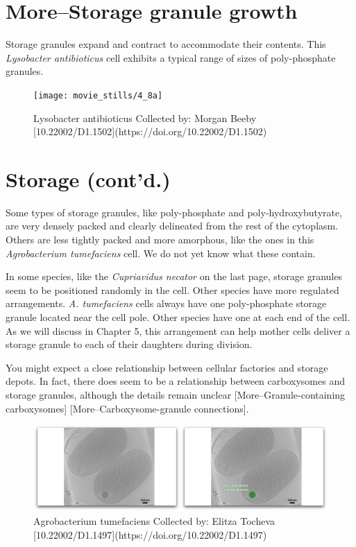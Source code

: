 \documentclass[]{tufte-book}
\begin{document}
\hypertarget{morestorage-granule-growth}{\section{More--Storage granule
growth}\label{morestorage-granule-growth}}

Storage granules expand and contract to accommodate their contents. This
\emph{Lysobacter antibioticus} cell exhibits a typical range of sizes of
poly-phosphate granules.

\begin{figure}
\texttt{[image: movie\_stills/4\_8a]} \caption[Lysobacter antibioticus Collected by]{Lysobacter antibioticus Collected by: Morgan Beeby [10.22002/D1.1502](https://doi.org/10.22002/D1.1502)}\label{fig:unnamed-chunk-73}
\end{figure}

\section{Storage (cont'd.)}\label{storage-contd.}

Some types of storage granules, like poly-phosphate and
poly-hydroxybutyrate, are very densely packed and clearly delineated
from the rest of the cytoplasm. Others are less tightly packed and more
amorphous, like the ones in this \emph{Agrobacterium tumefaciens} cell.
We do not yet know what these contain.

In some species, like the \emph{Cupriavidus necator} on the last page,
storage granules seem to be positioned randomly in the cell. Other
species have more regulated arrangements. \emph{A. tumefaciens} cells
always have one poly-phosphate storage granule located near the cell
pole. Other species have one at each end of the cell. As we will discuss
in Chapter 5, this arrangement can help mother cells deliver a storage
granule to each of their daughters during division.

You might expect a close relationship between cellular factories and
storage depots. In fact, there does seem to be a relationship between
carboxysomes and storage granules, although the details remain unclear
{[}More--Granule-containing carboxysomes{]} {[}More--Carboxysome-granule
connections{]}.

\begin{figure}
\includegraphics{movie_stills/4_9} \caption[Agrobacterium tumefaciens Collected by]{Agrobacterium tumefaciens Collected by: Elitza Tocheva [10.22002/D1.1497](https://doi.org/10.22002/D1.1497)}\label{fig:unnamed-chunk-74}
\end{figure}
\end{document}
